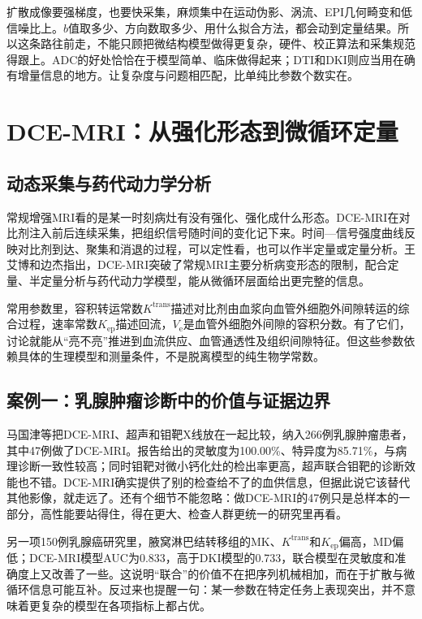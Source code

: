 扩散成像要强梯度，也要快采集，麻烦集中在运动伪影、涡流、EPI几何畸变和低信噪比上。$b$值取多少、方向数取多少、用什么拟合方法，都会动到定量结果\cite{wu2024mri}。所以这条路往前走，不能只顾把微结构模型做得更复杂，硬件、校正算法和采集规范得跟上。ADC的好处恰恰在于模型简单、临床做得起来；DTI和DKI则应当用在确有增量信息的地方。让复杂度与问题相匹配，比单纯比参数个数实在。

\section{DCE-MRI：从强化形态到微循环定量}

\subsection{动态采集与药代动力学分析}

常规增强MRI看的是某一时刻病灶有没有强化、强化成什么形态。DCE-MRI在对比剂注入前后连续采集，把组织信号随时间的变化记下来。时间—信号强度曲线反映对比剂到达、聚集和消退的过程，可以定性看，也可以作半定量或定量分析。王艾博和边杰指出，DCE-MRI突破了常规MRI主要分析病变形态的限制，配合定量、半定量分析与药代动力学模型，能从微循环层面给出更完整的信息\cite{wang2016dce}。

常用参数里，容积转运常数$K^{\mathrm{trans}}$描述对比剂由血浆向血管外细胞外间隙转运的综合过程，速率常数$K_{\mathrm{ep}}$描述回流，$V_{\mathrm{e}}$是血管外细胞外间隙的容积分数。有了它们，讨论就能从“亮不亮”推进到血流供应、血管通透性及组织间隙特征。但这些参数依赖具体的生理模型和测量条件，不是脱离模型的纯生物学常数\cite{wu2024mri,zhou2024prostate}。

\subsection{案例一：乳腺肿瘤诊断中的价值与证据边界}

马国津等把DCE-MRI、超声和钼靶X线放在一起比较，纳入266例乳腺肿瘤患者，其中47例做了DCE-MRI。报告给出的灵敏度为100.00\%、特异度为85.71\%，与病理诊断一致性较高；同时钼靶对微小钙化灶的检出率更高，超声联合钼靶的诊断效能也不错\cite{ma2024dce}。DCE-MRI确实提供了别的检查给不了的血供信息，但据此说它该替代其他影像，就走远了。还有个细节不能忽略：做DCE-MRI的47例只是总样本的一部分，高性能要站得住，得在更大、检查人群更统一的研究里再看。

另一项150例乳腺癌研究里，腋窝淋巴结转移组的MK、$K^{\mathrm{trans}}$和$K_{\mathrm{ep}}$偏高，MD偏低；DCE-MRI模型AUC为0.833，高于DKI模型的0.733，联合模型在灵敏度和准确度上又改善了一些\cite{an2024dki}。这说明“联合”的价值不在把序列机械相加，而在于扩散与微循环信息可能互补。反过来也提醒一句：某一参数在特定任务上表现突出，并不意味着更复杂的模型在各项指标上都占优。

